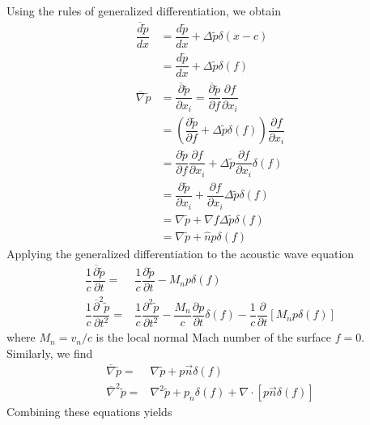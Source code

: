 \documentclass[onecolumn,10pt]{jhwhw}
\begin{document}
Using the rules of generalized differentiation, we obtain
\begin{align*}
\dfrac{\overline{d}\widetilde{p}}{dx}
    &= \dfrac{d\widetilde{p}}{dx} + \Delta\widetilde{p} \delta(x - c) \\
    &= \dfrac{d\widetilde{p}}{dx} + \Delta\widetilde{p} \delta(f) \\
\overline{\nabla} \widetilde{p}
&= \dfrac{\overline{\partial}\widetilde{p}}{\partial x_i}
= \dfrac{\overline{\partial}\widetilde{p}}{\partial f}
    \dfrac{\partial f}{\partial x_i} \\
&= \left( \dfrac{\partial\widetilde{p}}{\partial f}
    + \Delta \widetilde{p} \delta(f) \right)
    \dfrac{\partial f}{\partial x_i} \\
&= \dfrac{\partial\widetilde{p}}{\partial f} \dfrac{\partial f}{\partial x_i}
    + \Delta \widetilde{p} \dfrac{\partial f}{\partial x_i} \delta(f) \\
&= \dfrac{\partial\widetilde{p}}{\partial x_i}
    + \dfrac{\partial f}{\partial x_i} \Delta \widetilde{p} \delta(f) \\
&= \nabla\widetilde{p} + \nabla f \Delta\widetilde{p} \delta(f) \\
&= \nabla\widetilde{p} + \hat{n} p \delta(f)
\end{align*}
Applying the generalized differentiation to the acoustic wave equation
\begin{align*}
\dfrac{1}{c} \dfrac{\overline{\partial} \widetilde{p}}{\partial t} =& \dfrac{1}{c} \dfrac{\partial \widetilde{p}}{\partial t} - M_n p \delta (f) \\
\dfrac{1}{c} \dfrac{\overline{\partial}^2 \widetilde{p}}{\partial t^2} =& \dfrac{1}{c} \dfrac{\partial^2 \widetilde{p}}{\partial t^2}
- \dfrac{M_n}{c} \dfrac{\partial p}{\partial t} \delta (f)
-\dfrac{1}{c} \dfrac{\partial}{\partial t} [M_n p \delta (f)]
\end{align*}
where $M_n = v_n/c$ is the local normal Mach number of the surface $f=0$. Similarly, we find
\begin{align*}
\overline{\nabla} \widetilde{p} =& \nabla \widetilde{p} + p \vec{n} \delta (f) \\
\overline{\nabla}^2 \widetilde{p} =& \nabla^2 \widetilde{p} + p_n \delta (f)
+ \nabla \cdot [p \vec{n} \delta (f)]
\end{align*}
Combining these equations yields
\end{document}
